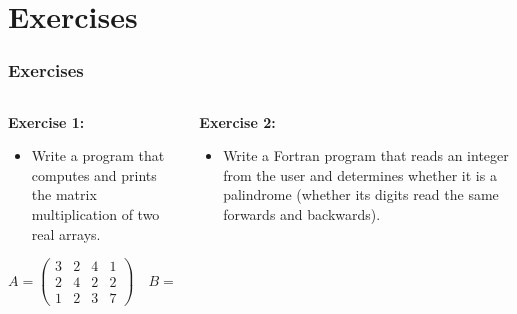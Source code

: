 \section{Exercises}

\begin{frame}[fragile]
	\frametitle{Exercises}
	\begin{columns}[T]
		\begin{column}{0.5\textwidth}
			\textbf{Exercise 1:}
			\begin{itemize}
				\item Write a program that computes and prints the matrix multiplication of two real arrays.
			\end{itemize}
			\vspace*{0.2cm}
			\[
			A = \begin{pmatrix}
			3 & 2 & 4 & 1 \\
			2 & 4 & 2 & 2 \\
			1 & 2 & 3 & 7
			\end{pmatrix}
			\quad
			B = \begin{pmatrix}
			3 & 2 & 4 \\
			2 & 1 & 2 \\
			3 & 0 & 2
			\end{pmatrix}
			\]
		\end{column}
		
		\begin{column}{0.5\textwidth}
			\textbf{Exercise 2:}
			\begin{itemize}
				\item Write a Fortran program that reads an integer from the user and determines whether it is a palindrome (whether its digits read the same forwards and backwards).
			\end{itemize}
			
		\end{column}
	\end{columns}
\end{frame}
